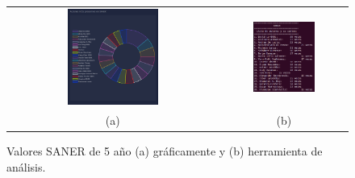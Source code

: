 \documentclass[a4paper, 12pt]{book}
\begin{document}
\begin{figure}[!h]
    \centering
    \begin{tabular}{cc}
    \includegraphics[width=0.45\textwidth]{img/saner_5_years_graph.png} &  
    \includegraphics[width=0.52\textwidth]{img/saner_5_years.png} \\ 
    (a) &(b) 
    \end{tabular}
    \caption{Valores SANER de 5 año (a) gráficamente y (b) herramienta de análisis.}
    \label{fig:comp_saner_5_year}
\end{figure}
\end{document}
